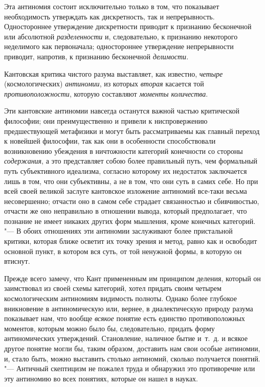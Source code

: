 Эта антиномия состоит исключительно только в том, что показывает
необходимость утверждать как дискретность, так и непрерывность.
Одностороннее утверждение дискретности приводит к признанию бесконечной или
абсолютной {\em разделенности} и, следовательно, к
признанию некоторого неделимого как первоначала; одностороннее утверждение
непрерывности приводит, напротив, к признанию бесконечной {\em делимости}.

Кантовская критика чистого разума выставляет, как известно,
{\em четыре} (космологических) {\em антиномии}, из которых
{\em вторая} касается той {\em противоположности}, которую составляют
{\em моменты количества}.

Эти кантовские антиномии навсегда останутся важной частью критической
философии; они преимущественно и привели к ниспровержению предшествующей
метафизики и могут быть рассматриваемы как главный переход к новейшей
философии, так как они в особенности способствовали возникновению убеждения
в ничтожности категорий конечности со стороны
{\em содержания}, а это представляет собою более
правильный путь, чем формальный путь субъективного идеализма, согласно
которому их недостаток заключается лишь в том, что они субъективны, а не в
том, что они суть в самих себе. Но при всей своей великой заслуге
кантовское изложение антиномий все-таки весьма несовершенно; отчасти оно в
самом себе страдает связанностью и сбивчивостью, отчасти же оно неправильно
в отношении вывода, который предполагает, что познание не имеет никаких
других форм мышления, кроме конечных категорий. "--- В обоих отношениях эти
антиномии заслуживают более пристальной критики, которая ближе осветит их
точку зрения и метод, равно как и освободит основной пункт, в котором вся
суть, от той ненужной формы, в которую он втиснут.

Прежде всего замечу, что Кант примененным им принципом деления, который он
заимствовал из своей схемы категорий, хотел придать своим четырем
космологическим антиномиям видимость полноты. Однако более глубокое
вникновение в антиномическую или, вернее, в диалектическую природу разума
показывает нам, что вообще {\em всякое} понятие есть
единство противоположных моментов, которым можно было бы, следовательно,
придать форму антиномических утверждений. Становление, наличное бытие
и~т.~д. и всякое другое понятие могли бы, таким образом, доставить нам свои
особые антиномии, и, стало быть, можно выставить столько антиномий, сколько
получается понятий. "--- Античный скептицизм не пожалел труда и обнаружил это
противоречие или эту антиномию во всех понятиях, которые он нашел в науках.

